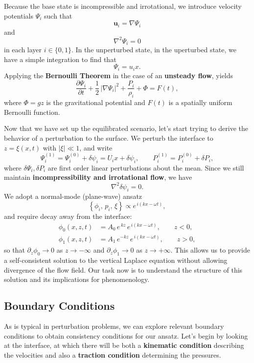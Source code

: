 Because the base state is incompressible and irrotational, we introduce velocity potentials $\Psi_i$
such that
\[
\mathbf{u}_i = \nabla \Psi_i
\]
and
\[
\nabla^2 \Psi_i = 0
\]
in each layer $i\in\{0,1\}$. In the unperturbed state, in the uperturbed state, we have a simple integration to find that
\[
\Psi_i = u_i x.
\]
Applying the \textbf{Bernoulli Theorem} in the case of an \textbf{unsteady flow}, yields
\begin{equation}
\label{eq:Bernoulli_full}
\frac{\partial \Psi_i}{\partial t} + \frac{1}{2}\,\lvert\nabla\Psi_i\rvert^2 + \frac{P_i}{\rho_i} + \Phi = F(t),
\end{equation}
where $\Phi = gz$ is the gravitational potential and $F(t)$ is a spatially uniform Bernoulli function.
\par
Now that we have set up the equilibrated scenario, let's start trying to derive the behavior of a perturbation to the surface. We perturb the interface to $z=\xi(x,t)$ with $\lvert\xi\rvert \ll 1$, and write
\[
\Psi^{(1)}_i = \Psi_i^{(0)} + \delta \psi_i= U_i x + \delta \psi_i, \qquad P^{(1)}_i = P_i^{(0)} + \delta P_i,
\]
where $\delta \Psi_i, \delta P_i$ are first order linear perturbations about the mean. Since we still maintain \textbf{incompressibility and irrotational flow}, we have
\[
\nabla^2 \delta \psi_i = 0.
\]
 We adopt a normal-mode (plane-wave) ansatz
\begin{equation}
\label{eq:ansatz}
\left\{\phi_i,\,p_i,\,\xi\right\} \propto e^{\,i(kx-\omega t)} ,
\end{equation}
and require decay away from the interface:
\begin{align}
\label{eq:harmonic_solutions}
\phi_0(x,z,t) &= A_0\,e^{\,k z}\,e^{\,i(kx-\omega t)} , \qquad z<0,\\
\phi_1(x,z,t) &= A_1\,e^{-k z}\,e^{\,i(kx-\omega t)} , \qquad z>0,
\end{align}
so that $\partial_z \phi_0 \to 0$ as $z\to -\infty$ and $\partial_z \phi_1 \to 0$ as $z\to +\infty$. This allows us to provide a self-consistent solution to the vertical Laplace equation without allowing divergence of the flow field. Our task now is to understand the structure of this solution and its implications for phenomenology.

\subsection*{Boundary Conditions}
As is typical in perturbation problems, we can explore relevant boundary conditions to obtain consistency conditions for our ansatz. Let's begin by looking at the interface, at which there will be both a \textbf{kinematic condition} describing the velocities and also a \textbf{traction condition} determining the pressures.
\par
